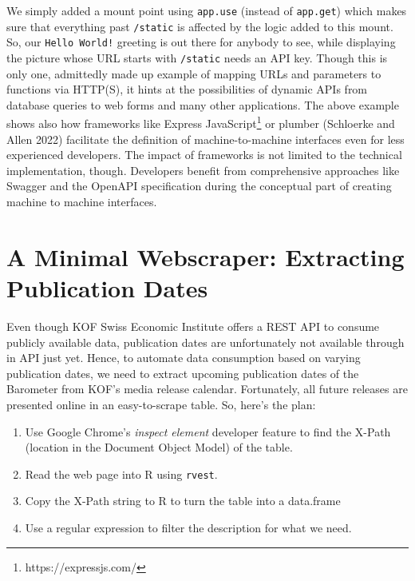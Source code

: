 \documentclass[
  12pt,
  letterpaper,
]{krantz}
\newenvironment{Shaded}{\begin{snugshade}}{\end{snugshade}}
\newcommand{\BuiltInTok}[1]{\textcolor[rgb]{0.00,0.23,0.31}{#1}}
\newcommand{\FunctionTok}[1]{\textcolor[rgb]{0.28,0.35,0.67}{#1}}
\newcommand{\KeywordTok}[1]{\textcolor[rgb]{0.00,0.23,0.31}{#1}}
\newcommand{\NormalTok}[1]{\textcolor[rgb]{0.00,0.23,0.31}{#1}}
\newcommand{\OperatorTok}[1]{\textcolor[rgb]{0.37,0.37,0.37}{#1}}
\newcommand{\SpecialCharTok}[1]{\textcolor[rgb]{0.37,0.37,0.37}{#1}}
\newcommand{\VerbatimStringTok}[1]{\textcolor[rgb]{0.13,0.47,0.30}{#1}}
\begin{document}
\begin{Shaded}
\end{Shaded}

We simply added a mount point using \texttt{app.use} (instead of
\texttt{app.get}) which makes sure that everything past \texttt{/static}
is affected by the logic added to this mount. So, our
\texttt{Hello\ World!} greeting is out there for anybody to see, while
displaying the picture whose URL starts with \texttt{/static} needs an
API key. Though this is only one, admittedly made up example of mapping
URLs and parameters to functions via HTTP(S), it hints at the
possibilities of dynamic APIs from database queries to
web forms and many other applications. The above example shows also how
frameworks like Express JavaScript\footnote{https://expressjs.com/} or
plumber (Schloerke and Allen 2022) facilitate the definition of
machine-to-machine interfaces even for less experienced developers. The
impact of frameworks is not limited to the technical implementation,
though. Developers benefit from comprehensive approaches like Swagger
and the OpenAPI specification during the conceptual part of creating
machine to machine interfaces.

\hypertarget{sec-webscrape}{%
\section{\texorpdfstring{A Minimal Webscraper:
Extracting Publication
Dates}{A Minimal Webscraper: Extracting Publication Dates}}\label{sec-webscrape}}

Even though KOF Swiss Economic Institute offers a REST API to consume
publicly available data, publication dates are unfortunately not
available through in API just yet. Hence, to automate data consumption
based on varying publication dates, we need to extract upcoming
publication dates of the Barometer from KOF's media release calendar.
Fortunately, all future releases are presented online in an
easy-to-scrape table. So, here's the plan:

\begin{enumerate}
\def\labelenumi{\arabic{enumi}.}
\item
  Use Google Chrome's \emph{inspect element} developer feature to find
  the X-Path (location in the Document Object Model) of the table.
\item
  Read the web page into R using \texttt{rvest}.
\item
  Copy the X-Path string to R to turn the table into a data.frame
\item
  Use a regular expression to filter the description for what we need.
\end{enumerate}
\end{document}
